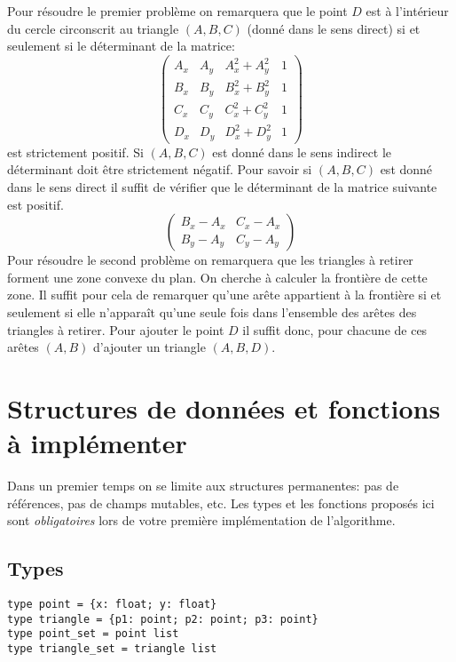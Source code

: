 \documentclass{../../../LaTeX/tdsimple}
\begin{document}
Pour résoudre le premier problème on remarquera que le point $D$ est à
l'intérieur du cercle circonscrit au triangle $(A,B,C)$ (donné dans le
sens direct) si et seulement si le déterminant de la matrice:
\[
\left(\begin{array}{cccc}
    A_x & A_y & A_x^2 + A_y^2 & 1\\
    B_x & B_y & B_x^2 + B_y^2 & 1\\
    C_x & C_y & C_x^2 + C_y^2 & 1\\
    D_x & D_y & D_x^2 + D_y^2 & 1
  \end{array}\right)
\]
est strictement positif.  Si $(A,B,C)$ est donné dans le sens indirect
le déterminant doit être strictement négatif.  Pour savoir si
$(A,B,C)$ est donné dans le sens direct il suffit de vérifier que le
déterminant de la matrice suivante est positif.
\[
\left(\begin{array}{cc}
    B_x - A_x & C_x - A_x \\
    B_y - A_y & C_y - A_y
  \end{array}\right)
\]
Pour résoudre le second problème on remarquera que les triangles à
retirer forment une zone convexe du plan.  On cherche à calculer la
frontière de cette zone.  Il suffit pour cela de remarquer qu'une
arête appartient à la frontière si et seulement si elle n'apparaît
qu'une seule fois dans l'ensemble des arêtes des triangles à retirer.
Pour ajouter le point $D$ il suffit donc, pour chacune de ces arêtes
$(A,B)$ d'ajouter un triangle $(A,B,D)$.


\section{Structures de données et fonctions à implémenter}

Dans un premier temps on se limite aux structures permanentes: pas de
références, pas de champs mutables, etc.  Les types et les fonctions
proposés ici sont \emph{obligatoires} lors de votre première
implémentation de l'algorithme.

\subsection{Types}

\begin{lstlisting}
type point = {x: float; y: float}
type triangle = {p1: point; p2: point; p3: point}
type point_set = point list
type triangle_set = triangle list
\end{lstlisting}
\end{document}
